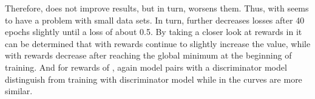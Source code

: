 Therefore, \origsampling does not improve results, but in turn, worsens them.
Thus, \kbgan with \origsampling seems to have a problem with small data sets.
In turn, \ussoftmax further decreases losses after 40 epochs slightly until a loss of about 0.5.
By taking a closer look at rewards in  it can be determined that with \origsampling rewards continue to slightly increase the value, while with \ussoftmax rewards decrease after reaching the global minimum at the beginning of training. 
And for rewards of \ussoftmax, again model pairs with a \transd discriminator model distinguish from training with \transe discriminator model while in \origsampling the curves are more similar.
